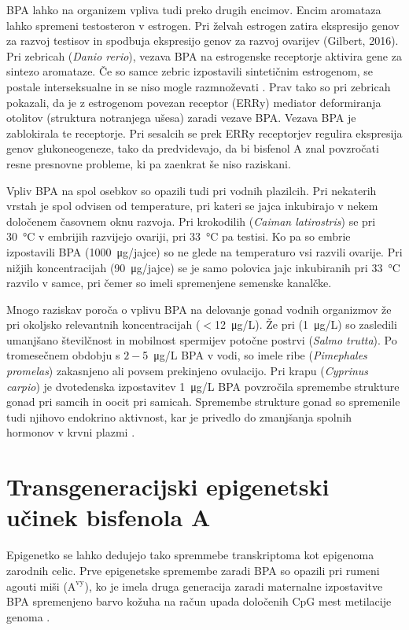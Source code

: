 \documentclass[a4paper, 11pt]{article}
\begin{document}
BPA lahko na organizem vpliva tudi preko drugih encimov. Encim aromataza lahko spremeni testosteron v estrogen. Pri želvah estrogen zatira ekspresijo genov za razvoj testisov in spodbuja ekspresijo genov za razvoj ovarijev {\color{red} (Gilbert, 2016)}. Pri zebricah ({\it Danio rerio}), vezava BPA na estrogenske receptorje aktivira gene za sintezo aromataze. Če so samce zebric izpostavili sintetičnim estrogenom, se postale interseksualne in se niso mogle razmnoževati \parencite{chung2011effects}. Prav tako so pri zebricah pokazali, da je z estrogenom {\color{red}povezan} receptor (ERRy) mediator deformiranja otolitov (struktura notranjega ušesa) zaradi vezave BPA. Vezava BPA je zablokirala te receptorje. Pri sesalcih se prek ERRy receptorjev regulira ekspresija genov glukoneogeneze, tako da predvidevajo, da bi bisfenol A znal povzročati resne presnovne probleme, ki pa zaenkrat še niso raziskani.  

Vpliv BPA na spol osebkov so opazili tudi pri vodnih plazilcih. Pri nekaterih vrstah je spol odvisen od temperature, pri kateri se jajca inkubirajo v nekem določenem časovnem oknu razvoja. Pri krokodilih ({\it Caiman latirostris}) se pri \SI{30}{\celsius} v embrijih razvijejo ovariji, pri \SI{33}{\celsius} pa testisi. Ko pa so embrie izpostavili BPA (\SI{1000}{\micro g/jajce}) so ne glede na temperaturo vsi razvili ovarije. Pri nižjih koncentracijah (\SI{90}{\micro g/jajce}) se je samo polovica jajc inkubiranih pri \SI{33}{\celsius} razvilo v samce, pri čemer so imeli spremenjene semenske kanalčke.

Mnogo raziskav poroča o vplivu BPA na delovanje gonad vodnih organizmov že pri okoljsko relevantnih koncentracijah ($<$\SI{12}{\micro g/L}). Že pri (\SI{1}{\micro g/L}) so zasledili umanjšano številčnost in mobilnost spermijev potočne postrvi ({\it Salmo trutta}). Po tromesečnem obdobju s $2-$\SI{5}{\micro g/L} BPA v vodi, so imele ribe ({\it Pimephales promelas}) zakasnjeno ali povsem prekinjeno ovulacijo. Pri krapu ({\it Cyprinus carpio}) je dvotedenska izpostavitev \SI{1}{\micro g/L} BPA povzročila spremembe strukture gonad pri samcih in oocit pri samicah. Spremembe strukture gonad so spremenile tudi njihovo endokrino aktivnost, kar je privedlo do zmanjšanja spolnih hormonov v krvni plazmi \parencite{canesi2015environmental}.

\section*{Transgeneracijski epigenetski učinek bisfenola A}
Epigenetko se lahko dedujejo tako spremmebe transkriptoma kot epigenoma zarodnih celic. Prve epigenetske spremembe zaradi BPA so opazili pri rumeni agouti miši ($\mathrm{A^{vy}}$), ko je imela druga generacija zaradi maternalne izpostavitve BPA spremenjeno barvo kožuha na račun upada določenih CpG mest metilacije genoma \parencite{lombo2015transgenerational}. 
\end{document}
